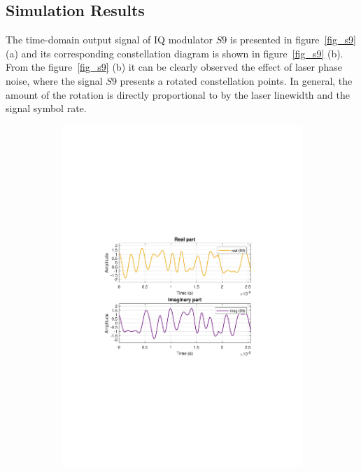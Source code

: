 \begin{refsection}
\subsection{Simulation Results}

The time-domain output signal of IQ modulator $S9$ is presented in figure~\ref{fig_s9} (a) and its corresponding constellation diagram is shown in figure~\ref{fig_s9} (b). From the figure~\ref{fig_s9} (b) it can be clearly observed the effect of laser phase noise, where the signal $S9$ presents a rotated constellation points. In general, the amount of the rotation is directly proportional to by the laser linewidth and the signal symbol rate.

\begin{figure}[h!]
\centering
\begin{subfigure}{.5\textwidth}
  \centering
  \includegraphics[width=\linewidth]{./sdf/dsp_laser_phase_compensation/figures/S9_td.pdf}

\end{subfigure}
\end{figure}
\end{refsection}
